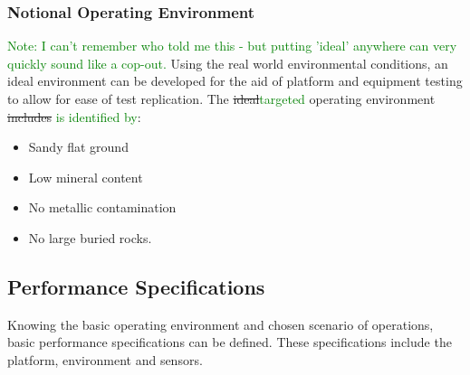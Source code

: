 \documentclass[main.tex]{subfiles}
\begin{document}
 \subsubsection{Notional Operating Environment}
 \textcolor{green}{Note: I can't remember who told me this - but putting 'ideal' anywhere can very quickly sound like a cop-out. }
 Using the real world environmental conditions, an ideal environment can be developed for the aid of platform and equipment testing to allow for ease of test replication. The \sout{ideal}\textcolor{green}{targeted} operating environment \sout{includes} \textcolor{green}{is identified by}: \textbf{\color{red}{THIS IS A LITTLE TRICKY TO READ - CONSIDER REWORDING}}
 \begin{itemize}
 \item Sandy flat ground 
 \item Low mineral content
 \item No metallic contamination 
 \item No large buried rocks.
 \end{itemize}
\subsection{Performance Specifications}
 Knowing the basic operating environment and chosen scenario of operations, basic performance specifications can be defined. These specifications include the platform, environment and sensors.
\end{document}
